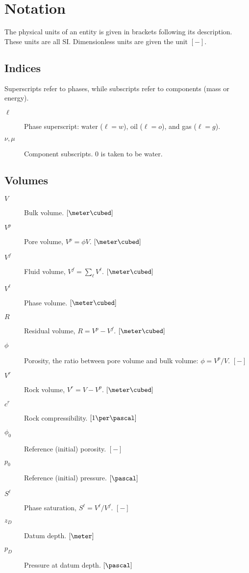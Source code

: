 \chapter{Notation}

The physical units of an entity is given in brackets following its
description. These units are all SI. Dimensionless units are given the
unit $[-]$.


\section{Indices}

Superscripts refer to phases, while subscripts refer to components
(mass or energy).

\begin{description}
\item[$\ell$] Phase superscript: water ($\ell=w$), oil ($\ell=o$), and
  gas ($\ell=g$).
\item[$\nu,\mu$] Component subscripts. $0$ is taken to be water.
\end{description}


\section{Volumes}

\begin{description}
\item[$V$] Bulk volume. $\left[\meter\cubed\right]$
\item[$V^p$] Pore volume, $V^p=\phi V$. $\left[\meter\cubed\right]$
\item[$V^f$] Fluid volume, $V^f=\sum_\ell V^\ell$. $\left[\meter\cubed\right]$
\item[$V^\ell$] Phase volume. $\left[\meter\cubed\right]$
\item[$R$] Residual volume, $R=V^p-V^f$. $\left[\meter\cubed\right]$
\item[$\phi$] Porosity, the ratio between pore volume and bulk volume:
  $\phi=V^p/V$. $\left[-\right]$
\item[$V^r$] Rock volume, $V^r=V - V^p$. $\left[\meter\cubed\right]$
\item[$c^r$] Rock compressibility. $\left[1\per\pascal\right]$
\item[$\phi_0$] Reference (initial) porosity. $\left[-\right]$
\item[$p_0$] Reference (initial) pressure. $\left[\pascal\right]$
\item[$S^\ell$] Phase saturation, $S^\ell=V^\ell/V^f$.
  $\left[-\right]$
\item[$z_D$] Datum depth. $\left[\meter\right]$
\item[$p_D$] Pressure at datum depth. $\left[\pascal\right]$
\end{description}

